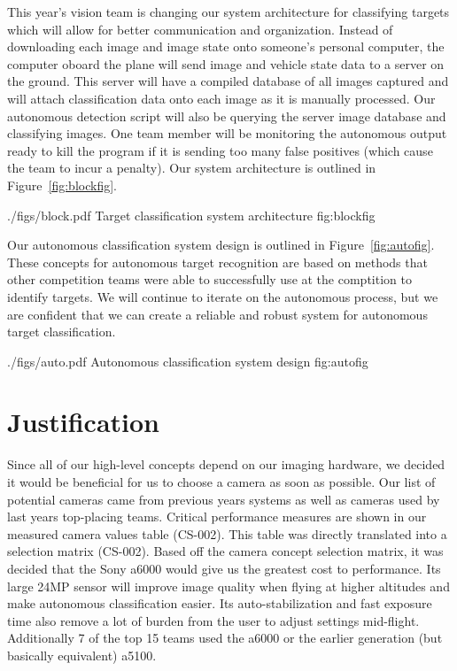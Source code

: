 \documentclass[]{auvsi_doc}
\begin{document}
This year's vision team is changing our system architecture for classifying targets which will
 allow for better communication and organization. Instead of downloading each image and image state
onto someone's personal computer, the computer oboard the plane will send image and vehicle state
data to a server on the ground. This server will have a compiled database of all images captured
and will attach classification data onto each image as it is manually processed. Our 
autonomous detection script will also be querying the server image database and classifying
images. One team member will be monitoring the autonomous output ready to kill the 
program if it is sending too many false positives (which cause the team to incur a 
penalty). Our system architecture is outlined in Figure~\ref{fig:blockfig}.

\AUVSIFigure
{./figs/block.pdf}
{\textwidth}
{Target classification system architecture}
{fig:blockfig}

Our autonomous classification system design is outlined in Figure~\ref{fig:autofig}.
These concepts for autonomous target recognition are based on methods that
other competition teams were able to successfully use at the comptition to
identify targets. We will continue to iterate on the autonomous process, but
we are confident that we can create a reliable and robust system for autonomous
target classification.

\AUVSIFigure
{./figs/auto.pdf}
{\textwidth}
{Autonomous classification system design}
{fig:autofig}

\section{Justification}

Since all of our high-level concepts depend on our imaging hardware, we decided it would be beneficial for us to choose a camera as 
soon as possible. Our list of potential cameras came from previous years systems as well as cameras used by last years top-placing 
teams. Critical performance measures are shown in our measured camera values table (CS-002). This table was directly translated 
into a selection matrix (CS-002). Based off the camera concept selection matrix, it was decided that the Sony a6000 would give us 
the greatest cost to performance. Its large 24MP sensor will improve image quality when flying at higher altitudes and make 
autonomous classification easier. Its auto-stabilization and fast exposure time also remove a lot of burden from the user to adjust 
settings mid-flight. Additionally 7 of the top 15 teams used the a6000 or the earlier generation (but basically equivalent) a5100.
\end{document}
